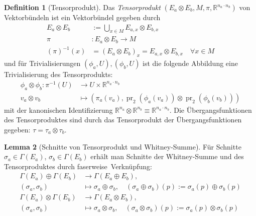\documentclass[a4paper]{scrreprt}
\numberwithin{equation}{chapter}
\DeclareMathOperator{\pr}{pr}
\newcommand{\R}{\mathbb{R}}
\theoremstyle{definition}
\newtheorem{defn}{Definition}[section]
\newtheorem{lemma}[defn]{Lemma}
\begin{document}
		\begin{defn}[Tensorprodukt]
			Das \emph{Tensorprodukt} $(E_a\otimes E_b ,M,\pi,\R^{n_a\cdot n_b})$ von Vektorbündeln ist ein Vektorbündel gegeben durch
			\begin{align*}
				E_a\otimes E_b&:=\bigcup_{x\in M}E_{a,x}\otimes E_{b,x}\\
				\pi&\colon E_a\otimes E_b\rightarrow M\\
				(\pi)^{-1}(x)&=(E_a\otimes E_b)_x=E_{a,x}\otimes E_{b,x}\quad \forall x\in M
			\end{align*}
			und für Trivialisierungen $(\phi_a,U),(\phi_b,U)$ ist die folgende Abbildung eine Trivialisierung des Tensorprodukts:
			\begin{align*}
				\phi_a\otimes\phi_b\colon\pi^{-1}(U)&\rightarrow U\times \R^{n_a\cdot n_b}\\
				v_a\otimes v_b&\mapsto (\pi_a(v_a), \pr_2(\phi_a(v_a))\otimes\pr_2(\phi_b(v_b)))
			\end{align*}
			mit der kanonischen Identifizierung  $\R^{n_a} \otimes\R^{n_b} \equiv \R^{n_a \cdot n_b}$.
			Die Übergangsfunktionen des Tensorproduktes sind durch das Tensorprodukt der Übergangsfunktionen gegeben: $\tau=\tau_a\otimes\tau_b$.
		\end{defn}
		
		\begin{lemma}[Schnitte von Tensorprodukt und Whitney-Summe]
			Für Schnitte $\sigma_a\in\Gamma(E_a)$, $\sigma_b\in\Gamma(E_b)$ erhält man Schnitte der Whitney-Summe und des Tensorproduktes durch \glqq faserweise\grqq\ Verknüpfung:
			\begin{align*}
				\Gamma(E_a)\oplus\Gamma(E_b)&\rightarrow\Gamma(E_a\oplus E_b),\\
				(\sigma_a,\sigma_b)&\mapsto \sigma_a\oplus\sigma_b,\quad (\sigma_a\oplus\sigma_b)(p):=\sigma_a(p)\oplus\sigma_b(p)\\
				\Gamma(E_a)\otimes\Gamma(E_b)&\rightarrow\Gamma(E_a\otimes E_b),\\
				(\sigma_a,\sigma_b)&\mapsto \sigma_a\otimes\sigma_b,\quad (\sigma_a\otimes\sigma_b)(p):=\sigma_a(p)\otimes\sigma_b(p)
			\end{align*}
		\end{lemma}
		
\end{document}
